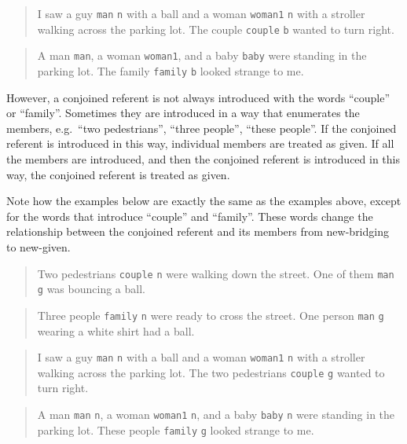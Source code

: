 \documentclass[
]{book}
\begin{document}
\begin{quote}
I saw a guy \texttt{man} \texttt{n} with a ball and a woman \texttt{woman1} \texttt{n} with a stroller walking across the parking lot.
The couple \texttt{couple} \texttt{b} wanted to turn right.
\end{quote}

\begin{quote}
A man \texttt{man}, a woman \texttt{woman1}, and a baby \texttt{baby} were standing in the parking lot.
The family \texttt{family} \texttt{b} looked strange to me.
\end{quote}

However, a conjoined referent is not always introduced with the words ``couple'' or ``family''.
Sometimes they are introduced in a way that enumerates the members, e.g.~``two pedestrians'', ``three people'', ``these people''.
If the conjoined referent is introduced in this way, individual members are treated as given.
If all the members are introduced, and then the conjoined referent is introduced in this way, the conjoined referent is treated as given.

Note how the examples below are exactly the same as the examples above, except for the words that introduce ``couple'' and ``family''. These words change the relationship between the conjoined referent and its members from new-bridging to new-given.

\begin{quote}
Two pedestrians \texttt{couple} \texttt{n} were walking down the street.
One of them \texttt{man} \texttt{g} was bouncing a ball.
\end{quote}

\begin{quote}
Three people \texttt{family} \texttt{n} were ready to cross the street.
One person \texttt{man} \texttt{g} wearing a white shirt had a ball.
\end{quote}

\begin{quote}
I saw a guy \texttt{man} \texttt{n} with a ball and a woman \texttt{woman1} \texttt{n} with a stroller walking across the parking lot.
The two pedestrians \texttt{couple} \texttt{g} wanted to turn right.
\end{quote}

\begin{quote}
A man \texttt{man} \texttt{n}, a woman \texttt{woman1} \texttt{n}, and a baby \texttt{baby} \texttt{n} were standing in the parking lot.
These people \texttt{family} \texttt{g} looked strange to me.
\end{quote}
\end{document}
